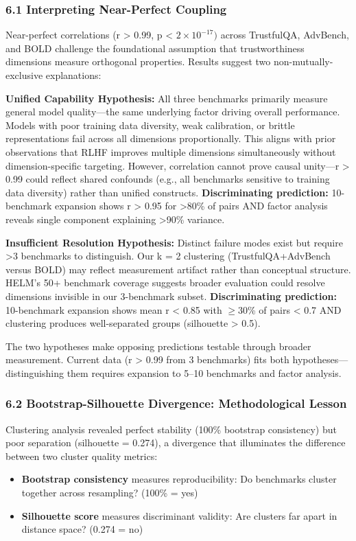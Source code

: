 
\subsubsection{6.1 Interpreting Near-Perfect Coupling}

Near-perfect correlations (r > 0.99, p < $2\times 10^{-17})$ across TrustfulQA, AdvBench, and BOLD challenge the foundational assumption that trustworthiness dimensions measure orthogonal properties. Results suggest two non-mutually-exclusive explanations:

\textbf{Unified Capability Hypothesis:} All three benchmarks primarily measure general model quality---the same underlying factor driving overall performance. Models with poor training data diversity, weak calibration, or brittle representations fail across all dimensions proportionally. This aligns with prior observations that RLHF improves multiple dimensions simultaneously without dimension-specific targeting. However, correlation cannot prove causal unity---r > 0.99 could reflect shared confounds (e.g., all benchmarks sensitive to training data diversity) rather than unified constructs. \textbf{Discriminating prediction:} 10-benchmark expansion shows r > 0.95 for >80\% of pairs AND factor analysis reveals single component explaining >90\% variance.

\textbf{Insufficient Resolution Hypothesis:} Distinct failure modes exist but require >3 benchmarks to distinguish. Our k = 2 clustering (TrustfulQA+AdvBench versus BOLD) may reflect measurement artifact rather than conceptual structure. HELM's 50+ benchmark coverage suggests broader evaluation could resolve dimensions invisible in our 3-benchmark subset. \textbf{Discriminating prediction:} 10-benchmark expansion shows mean r < 0.85 with $\geq 30$\% of pairs < 0.7 AND clustering produces well-separated groups (silhouette > 0.5).

The two hypotheses make opposing predictions testable through broader measurement. Current data (r > 0.99 from 3 benchmarks) fits both hypotheses---distinguishing them requires expansion to 5--10 benchmarks and factor analysis.

\subsubsection{6.2 Bootstrap-Silhouette Divergence: Methodological Lesson}

Clustering analysis revealed perfect stability (100\% bootstrap consistency) but poor separation (silhouette = 0.274), a divergence that illuminates the difference between two cluster quality metrics:
\begin{itemize}
\item \textbf{Bootstrap consistency} measures reproducibility: Do benchmarks cluster together across resampling? (100\% = yes)
\item \textbf{Silhouette score} measures discriminant validity: Are clusters far apart in distance space? (0.274 = no)
\end{itemize}

